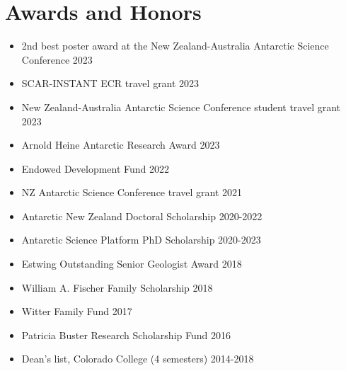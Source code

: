 \documentclass{ExpressiveResume}
\begin{document}




\section{Awards and Honors}
\begin{multicols}{2}
    \begin{itemize}
        \item 2nd best poster award at the New Zealand-Australia Antarctic Science
              Conference \hfill 2023
        \item SCAR-INSTANT ECR travel grant \hfill 2023
        \item New Zealand-Australia Antarctic Science Conference student travel grant \hfill 2023
        \item Arnold Heine Antarctic Research Award \hfill 2023
        \item Endowed Development Fund \hfill 2022
        \item NZ Antarctic Science Conference travel grant \hfill 2021
        \item Antarctic New Zealand Doctoral Scholarship \hfill 2020-2022
        \item Antarctic Science Platform PhD Scholarship \hfill 2020-2023
        \item Estwing Outstanding Senior Geologist Award \hfill 2018
        \item William A. Fischer Family Scholarship \hfill 2018
        \item Witter Family Fund \hfill 2017
        \item Patricia Buster Research Scholarship Fund \hfill2016
        \item Dean's list, Colorado College (4 semesters) \hfill 2014-2018

    \end{itemize}
\end{multicols}
\end{document}
